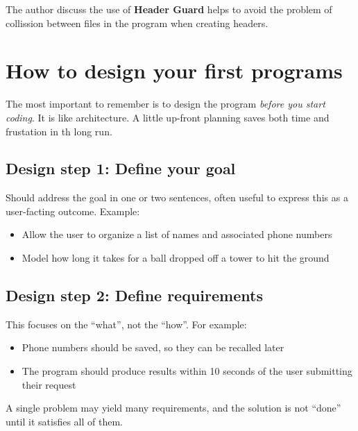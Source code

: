 \documentclass[
  letterpaper,
  DIV=11,
  numbers=noendperiod]{scrreprt}
\providecommand{\tightlist}{%
  \setlength{\itemsep}{0pt}\setlength{\parskip}{0pt}}\usepackage{longtable,booktabs,array}
\begin{document}
The author discuss the use of \textbf{Header Guard} helps to avoid the
problem of collission between files in the program when creating
headers.

\hypertarget{how-to-design-your-first-programs}{%
\section{How to design your first
programs}\label{how-to-design-your-first-programs}}

The most important to remember is to design the program \emph{before you
start coding}. It is like architecture. A little up-front planning saves
both time and frustation in th long run.

\hypertarget{design-step-1-define-your-goal}{%
\subsection{Design step 1: Define your
goal}\label{design-step-1-define-your-goal}}

Should address the goal in one or two sentences, often useful to express
this as a user-facting outcome. Example:

\begin{itemize}
\tightlist
\item
  Allow the user to organize a list of names and associated phone
  numbers
\item
  Model how long it takes for a ball dropped off a tower to hit the
  ground
\end{itemize}

\hypertarget{design-step-2-define-requirements}{%
\subsection{Design step 2: Define
requirements}\label{design-step-2-define-requirements}}

This focuses on the ``what'', not the ``how''. For example:

\begin{itemize}
\tightlist
\item
  Phone numbers should be saved, so they can be recalled later
\item
  The program should produce results within 10 seconds of the user
  submitting their request
\end{itemize}

A single problem may yield many requirements, and the solution is not
``done'' until it satisfies all of them.
\end{document}
